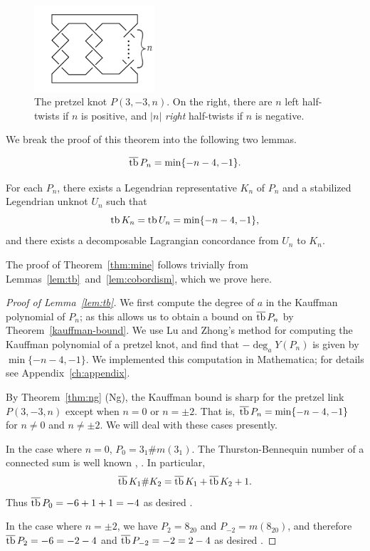 \begin{figure}[ht!]
    \centering
    \includegraphics[width=0.4\textwidth]{images/pretzel-knot.pdf}
    \caption{The pretzel knot $P(3, -3, n)$. On the right, there are $n$ left half-twists if $n$ is positive, and $|n|$ \emph{right} half-twists if $n$ is negative.}
    \label{fig:pretzel-knot}
\end{figure}

We break the proof of this theorem into the following two lemmas.
\begin{lemma}\label{lem:tb}
    \[
        \overline{\operatorname{tb}}\, P_n = \min \{ -n-4, -1\}.
    \]
\end{lemma}

\begin{lemma}\label{lem:cobordism}
    For each $P_n$, there exists a Legendrian representative $K_n$ of $P_n$ and a stabilized Legendrian unknot $U_n$ such that 
    \[
        \operatorname{tb} K_n = \operatorname{tb} U_n = \min \{-n-4, -1\},
    \]
    and there exists a decomposable Lagrangian concordance from $U_n$ to $K_n$.
\end{lemma}

The proof of Theorem~\ref{thm:mine} follows trivially from Lemmas~\ref{lem:tb}~and~\ref{lem:cobordism}, which we prove here.

\begin{proof}[Proof of Lemma~\ref{lem:tb}]

    We first compute the degree of $a$ in the Kauffman polynomial of $P_n$; as this allows us to obtain a bound on $\overline{\operatorname{tb}}\, P_n$ by Theorem~\ref{kauffman-bound}. We use Lu and Zhong's method \cite{lu-zhong} for computing the Kauffman polynomial of a pretzel knot, and find that $- \deg_a Y(P_n)$ is given by $\min\{-n-4, -1\}$. We implemented this computation in Mathematica; for details see Appendix~\ref{ch:appendix}.
    
    By Theorem~\ref{thm:ng} (Ng), the Kauffman bound is sharp for the pretzel link $P(3, -3, n)$ except when $n = 0$ or $n = \pm 2$. That is, ${\overline{\operatorname{tb}}\, P_n = \min\{-n-4, -1\}}$ for $n \neq 0$ and $n \neq \pm 2$. We will deal with these cases presently.

    In the case where $n = 0$, ${P_0 = 3_1 \# m(3_1)}$. The Thurston-Bennequin number of a connected sum is well known \cite{torisu}, \cite{honda}. In particular,
    \[
        \overline{\operatorname{tb}}\,{K_1 \# K_2} = \overline{\operatorname{tb}}\, K_1 + \overline{\operatorname{tb}}\, K_2 + 1.
    \]
    Thus $\overline{\operatorname{tb}}\, P_0 = -6 + 1 + 1 = -4$ as desired \cite{atlas}.

    In the case where $n = \pm 2$, we have $P_2 = 8_{20}$ and $P_{-2} = m(8_{20})$, and therefore ${\overline{\operatorname{tb}}\, P_2 = -6 = -2-4}$ and ${\overline{\operatorname{tb}}\, P_{-2} = -2 = 2-4}$ as desired \cite{atlas}.

\end{proof}


